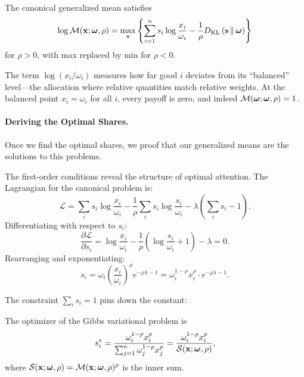 \begin{proposition}
\label{prop:gibbs-canonical}
The canonical generalized mean satisfies
\begin{equation}
\label{eq:gibbs-canonical}
\log \mathcal{M}(\mathbf{x}; \boldsymbol{\omega}, \rho) = \max_{\mathbf{s}} \left\{ \sum_{i=1}^n s_i \log \frac{x_i}{\omega_i} - \frac{1}{\rho} D_{\mathrm{KL}}\left(\mathbf{s} \,\|\, \boldsymbol{\omega}\right) \right\}
\end{equation}
for $\rho > 0$, with max replaced by min for $\rho < 0$.
\end{proposition}

The term $\log(x_i/\omega_i)$ measures how far good $i$ deviates from its ``balanced'' level---the allocation where relative quantities match relative weights. At the balanced point $x_i = \omega_i$ for all $i$, every payoff is zero, and indeed $\mathcal{M}(\boldsymbol{\omega}; \boldsymbol{\omega}, \rho) = 1$.

\paragraph{Deriving the Optimal Shares.}
Once we find the optimal shares, we proof that our generalized means are the solutions to this problems. 

The first-order conditions reveal the structure of optimal attention. The Lagrangian for the canonical problem is:
\begin{equation}
\mathcal{L} = \sum_i s_i \log \frac{x_i}{\omega_i} - \frac{1}{\rho} \sum_i s_i \log \frac{s_i}{\omega_i} - \lambda\left(\sum_i s_i - 1\right).
\end{equation}
Differentiating with respect to $s_i$:
\begin{equation}
\frac{\partial \mathcal{L}}{\partial s_i} = \log \frac{x_i}{\omega_i} - \frac{1}{\rho}\left(\log \frac{s_i}{\omega_i} + 1\right) - \lambda = 0.
\end{equation}
Rearranging and exponentiating:
\begin{equation}
s_i = \omega_i \left(\frac{x_i}{\omega_i}\right)^\rho e^{-\rho\lambda - 1} = \omega_i^{1-\rho} x_i^\rho \cdot e^{-\rho\lambda - 1}.
\end{equation}

The constraint $\sum_i s_i = 1$ pins down the constant:
\begin{proposition}
\label{prop:optimal-shares}
The optimizer of the Gibbs variational problem is
\begin{equation}
\label{eq:optimal-shares}
s_i^* = \frac{\omega_i^{1-\rho} x_i^\rho}{\sum_{j=1}^n \omega_j^{1-\rho} x_j^\rho} = \frac{\omega_i^{1-\rho} x_i^\rho}{\mathcal{S}(\mathbf{x}; \boldsymbol{\omega}, \rho)},
\end{equation}
where $\mathcal{S}(\mathbf{x}; \boldsymbol{\omega}, \rho) = \mathcal{M}(\mathbf{x}; \boldsymbol{\omega}, \rho)^\rho$ is the inner sum.
\end{proposition}

